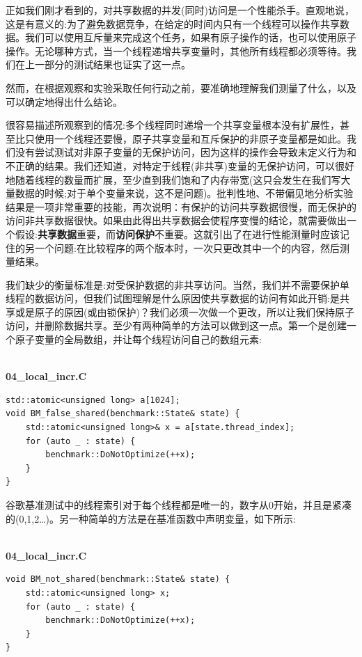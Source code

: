 正如我们刚才看到的，对共享数据的并发(同时)访问是一个性能杀手。直观地说，这是有意义的:为了避免数据竞争，在给定的时间内只有一个线程可以操作共享数据。我们可以使用互斥量来完成这个任务，如果有原子操作的话，也可以使用原子操作。无论哪种方式，当一个线程递增共享变量时，其他所有线程都必须等待。我们在上一部分的测试结果也证实了这一点。

然而，在根据观察和实验采取任何行动之前，要准确地理解我们测量了什么，以及可以确定地得出什么结论。

很容易描述所观察到的情况:多个线程同时递增一个共享变量根本没有扩展性，甚至比只使用一个线程还要慢，原子共享变量和互斥保护的非原子变量都是如此。我们没有尝试测试对非原子变量的无保护访问，因为这样的操作会导致未定义行为和不正确的结果。我们还知道，对特定于线程(非共享)变量的无保护访问，可以很好地随着线程的数量而扩展，至少直到我们饱和了内存带宽(这只会发生在我们写大量数据的时候;对于单个变量来说，这不是问题)。批判性地、不带偏见地分析实验结果是一项非常重要的技能，再次说明：有保护的访问共享数据很慢，而无保护的访问非共享数据很快。如果由此得出共享数据会使程序变慢的结论，就需要做出一个假设:\textbf{共享数据}重要，而\textbf{访问保护}不重要。这就引出了在进行性能测量时应该记住的另一个问题:在比较程序的两个版本时，一次只更改其中一个的内容，然后测量结果。

我们缺少的衡量标准是:对受保护数据的非共享访问。当然，我们并不需要保护单线程的数据访问，但我们试图理解是什么原因使共享数据的访问有如此开销:是共享或是原子的原因(或由锁保护)？我们必须一次做一个更改，所以让我们保持原子访问，并删除数据共享。至少有两种简单的方法可以做到这一点。第一个是创建一个原子变量的全局数组，并让每个线程访问自己的数组元素:

\hspace*{\fill} \\ %
\noindent
\textbf{04\_local\_incr.C}
\begin{lstlisting}[style=styleCXX]
std::atomic<unsigned long> a[1024];
void BM_false_shared(benchmark::State& state) {
	std::atomic<unsigned long>& x = a[state.thread_index];
	for (auto _ : state) {
		benchmark::DoNotOptimize(++x);
	}
}
\end{lstlisting}

谷歌基准测试中的线程索引对于每个线程都是唯一的，数字从0开始，并且是紧凑的(0,1,2…)。另一种简单的方法是在基准函数中声明变量，如下所示:

\hspace*{\fill} \\ %
\noindent
\textbf{04\_local\_incr.C}
\begin{lstlisting}[style=styleCXX]
void BM_not_shared(benchmark::State& state) {
	std::atomic<unsigned long> x;
	for (auto _ : state) {
		benchmark::DoNotOptimize(++x);
	}
}
\end{lstlisting}

